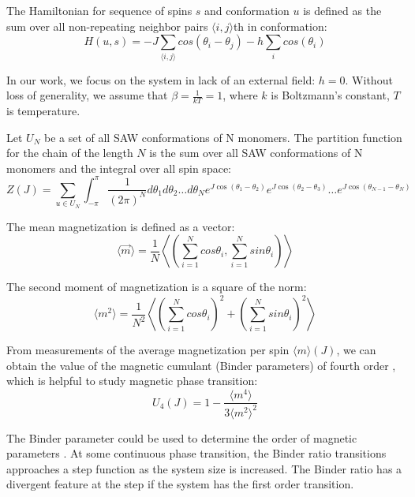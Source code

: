  The Hamiltonian for sequence of spins $s$ and conformation $u$ is defined as the sum over all  non-repeating neighbor  pairs $\langle i, j \rangle$th in conformation:
\begin{equation}
\label{hamiltonian}
H(u,s) = -J \sum_{ \langle i, j \rangle } cos(\theta_i - \theta_j) - h \sum_i cos(\theta_i)
\end{equation}

In our work, we focus on the system in lack of an external field: $h=0$.  
Without loss of generality, we assume that $\beta = \frac{1}{kT} = 1$, where $k$ is Boltzmann’s constant, $T$ is temperature. 

Let $U_N$ be a set of all SAW conformations of N monomers. The partition function for the chain of the length $N$ is the sum over all SAW conformations of N monomers and the integral over all spin space:  
\begin{equation}
\label{partitionfunction}
Z(J) =  \sum_{u \in U_N }  \int_{-\pi}^{\pi}   \frac{1}{ (2 \pi  )^N}
     d \theta_1 d \theta_2 \dots d\theta_N
 e ^{J \cos(\theta_1-\theta_2)} e ^{J \cos(\theta_2-\theta_3)} \dots 
 e ^{J \cos(\theta_{N-1}-\theta_N)} %
\end{equation}

The mean magnetization is defined as a vector:
\begin{equation}
\label{meanmagnetization}
\langle \vec{m} \rangle = \frac{1}{N} \left\langle ( \sum_{i=1}^{N} cos \theta_i, \sum_{i=1}^{N} sin \theta_i  ) \right\rangle
\end{equation}

The second moment of magnetization is a square of the norm:
\begin{equation}
\label{secondmomentmagnetization}
\langle m^2 \rangle = \frac{1}{N^2} \left\langle ( \sum_{i=1}^{N} cos \theta_i )^2 +  (\sum_{i=1}^{N} sin \theta_i  )^2 \right\rangle
\end{equation}

From measurements of the average magnetization per spin $\langle m \rangle (J)$, we can obtain the value of the magnetic cumulant  (Binder parameters) of fourth order \cite{Binder2010}, which is helpful to study magnetic phase transition:
\begin{equation}
\label{binderqum}
U_4 (J) = 1 - \frac{ \langle m^4 \rangle}{3 \langle m^2 \rangle^2  }
\end{equation}

The Binder parameter  could be used to determine the order of magnetic parameters \cite{binder1981finite}.  At some
continuous phase transition, the Binder ratio transitions approaches a step function as the system size is increased. The Binder ratio  has a divergent feature at the step if the system has the first order transition. 

